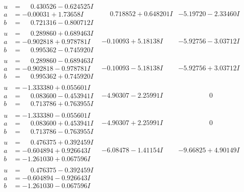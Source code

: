 \documentclass[1p]{elsarticle_modified}
\theoremstyle{definition}
\begin{document}
$$\begin{array}{c|c|c}
\begin{aligned}
u &= \phantom{-}0.430526 - 0.624525 I \\
a &= -0.00031 + 1.73658 I \\
b &= \phantom{-}0.721316 - 0.800712 I\end{aligned}
 & \phantom{-}0.718852 + 0.648201 I & -5.19720 - 2.33460 I \\ \hline\begin{aligned}
u &= \phantom{-}0.289860 + 0.689463 I \\
a &= -0.902818 + 0.978781 I \\
b &= \phantom{-}0.995362 - 0.745920 I\end{aligned}
 & -0.10093 + 5.18138 I & -5.92756 - 3.03712 I \\ \hline\begin{aligned}
u &= \phantom{-}0.289860 - 0.689463 I \\
a &= -0.902818 - 0.978781 I \\
b &= \phantom{-}0.995362 + 0.745920 I\end{aligned}
 & -0.10093 - 5.18138 I & -5.92756 + 3.03712 I \\ \hline\begin{aligned}
u &= -1.333380 + 0.055601 I \\
a &= \phantom{-}0.083600 - 0.453941 I \\
b &= \phantom{-}0.713786 + 0.763955 I\end{aligned}
 & -4.90307 - 2.25991 I & \phantom{-0.000000 } 0 \\ \hline\begin{aligned}
u &= -1.333380 - 0.055601 I \\
a &= \phantom{-}0.083600 + 0.453941 I \\
b &= \phantom{-}0.713786 - 0.763955 I\end{aligned}
 & -4.90307 + 2.25991 I & \phantom{-0.000000 } 0 \\ \hline\begin{aligned}
u &= \phantom{-}0.476375 + 0.392459 I \\
a &= -0.604894 + 0.926643 I \\
b &= -1.261030 + 0.067596 I\end{aligned}
 & -6.08478 - 1.41154 I & -9.66825 + 4.90149 I \\ \hline\begin{aligned}
u &= \phantom{-}0.476375 - 0.392459 I \\
a &= -0.604894 - 0.926643 I \\
b &= -1.261030 - 0.067596 I\end{aligned}

\end{array}$$
\end{document}
